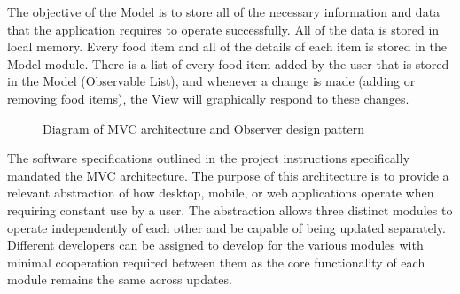 \documentclass{scrreprt}
\begin{document}
The objective of the Model is to store all of the necessary information and data that the application requires to operate successfully. All of the data is stored in local memory. Every food item and all of the details of each item is stored in the Model module. There is a list of every food item added by the user that is stored in the Model (Observable List), and whenever a change is made (adding or removing food items), the View will graphically respond to these changes. \\

\begin{figure}[!htbp]
\centering
{}
\caption{Diagram of MVC architecture and Observer design pattern}
\end{figure}

The software specifications outlined in the project instructions specifically mandated the MVC architecture. The purpose of this architecture is to provide a relevant abstraction of how desktop, mobile, or web applications operate when requiring constant use by a user. The abstraction allows three distinct modules to operate independently of each other and be capable of being updated separately. Different developers can be assigned to develop for the various modules with minimal cooperation required between them as the core functionality of each module remains the same across updates.
\end{document}
